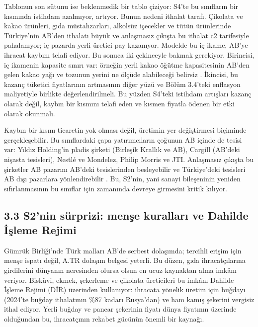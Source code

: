 Tablonun son sütunu ise beklenmedik bir tablo çiziyor: S4'te bu sınıfların bir kısmında istihdam azalmıyor, artıyor. Bunun nedeni ithalat tarafı. Çikolata ve kakao ürünleri, gıda müstahzarları, alkolsüz içecekler ve tütün ürünlerinde Türkiye'nin AB'den ithalatı büyük ve anlaşmasız çıkışta bu ithalat c2 tarifesiyle pahalanıyor; iç pazarda yerli üretici pay kazanıyor. Modelde bu iç ikame, AB'ye ihracat kaybını telafi ediyor. Bu sonuca iki çekinceyle bakmak gerekiyor. Birincisi, iç ikamenin kapasite sınırı var: örneğin yerli kakao öğütme kapasitesinin AB'den gelen kakao yağı ve tozunun yerini ne ölçüde alabileceği belirsiz \etiketD{}. İkincisi, bu kazanç tüketici fiyatlarının artmasının diğer yüzü ve Bölüm 3.4'teki enflasyon maliyetiyle birlikte değerlendirilmeli. Bu yüzden S4'teki istihdam artışları kazanç olarak değil, kaybın bir kısmını telafi eden ve kısmen fiyatla ödenen bir etki olarak okunmalı.

Kaybın bir kısmı ticaretin yok olması değil, üretimin yer değiştirmesi biçiminde gerçekleşebilir. Bu sınıflardaki çapa yatırımcıların çoğunun AB içinde de tesisi var: Yıldız Holding'in pladis şirketi (Birleşik Krallık ve AB), Cargill (AB'deki nişasta tesisleri), Nestlé ve Mondelez, Philip Morris ve JTI. Anlaşmasız çıkışta bu şirketler AB pazarını AB'deki tesislerinden besleyebilir ve Türkiye'deki tesisleri AB dışı pazarlara yönlendirebilir \etiketH{}. Bu, S2'nin, yani sanayi bileşeninin yeniden sıfırlanmasının bu sınıflar için zamanında devreye girmesini kritik kılıyor.

\hypertarget{nace_kartlar_10-12-33-s2nin-suxfcrprizi-menux15fe-kurallarux131-ve-dahilde-iux307ux15fleme-rejimi}{%
\subsection{3.3 S2'nin sürprizi: menşe kuralları ve Dahilde İşleme Rejimi}\label{nace_kartlar_10-12-33-s2nin-suxfcrprizi-menux15fe-kurallarux131-ve-dahilde-iux307ux15fleme-rejimi}}

Gümrük Birliği'nde Türk malları AB'de serbest dolaşımda; tercihli erişim için menşe ispatı değil, A.TR dolaşım belgesi yeterli. Bu düzen, gıda ihracatçılarına girdilerini dünyanın neresinden olursa olsun en ucuz kaynaktan alma imkânı veriyor. Bisküvi, ekmek, şekerleme ve çikolata üreticileri bu imkânı Dahilde İşleme Rejimi (DİR) üzerinden kullanıyor: ihracata yönelik üretim için buğdayı (2024'te buğday ithalatının \%87 kadarı Rusya'dan) ve ham kamış şekerini vergisiz ithal ediyor. Yerli buğday ve pancar şekerinin fiyatı dünya fiyatının üzerinde olduğundan bu, ihracatçının rekabet gücünün önemli bir kaynağı.

